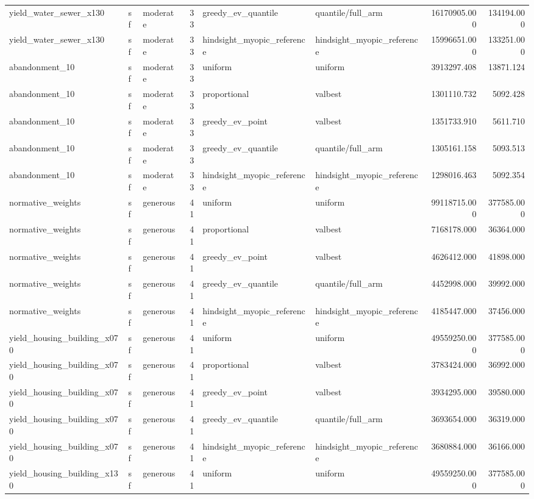 \begin{tabular}{lllrllrr}
yield\_water\_sewer\_x130 & sf & moderate & 33 & greedy\_ev\_quantile & quantile/full\_arm & 16170905.000 & 134194.000 \\
yield\_water\_sewer\_x130 & sf & moderate & 33 & hindsight\_myopic\_reference & hindsight\_myopic\_reference & 15996651.000 & 133251.000 \\
abandonment\_10 & sf & moderate & 33 & uniform & uniform & 3913297.408 & 13871.124 \\
abandonment\_10 & sf & moderate & 33 & proportional & valbest & 1301110.732 & 5092.428 \\
abandonment\_10 & sf & moderate & 33 & greedy\_ev\_point & valbest & 1351733.910 & 5611.710 \\
abandonment\_10 & sf & moderate & 33 & greedy\_ev\_quantile & quantile/full\_arm & 1305161.158 & 5093.513 \\
abandonment\_10 & sf & moderate & 33 & hindsight\_myopic\_reference & hindsight\_myopic\_reference & 1298016.463 & 5092.354 \\
normative\_weights & sf & generous & 41 & uniform & uniform & 99118715.000 & 377585.000 \\
normative\_weights & sf & generous & 41 & proportional & valbest & 7168178.000 & 36364.000 \\
normative\_weights & sf & generous & 41 & greedy\_ev\_point & valbest & 4626412.000 & 41898.000 \\
normative\_weights & sf & generous & 41 & greedy\_ev\_quantile & quantile/full\_arm & 4452998.000 & 39992.000 \\
normative\_weights & sf & generous & 41 & hindsight\_myopic\_reference & hindsight\_myopic\_reference & 4185447.000 & 37456.000 \\
yield\_housing\_building\_x070 & sf & generous & 41 & uniform & uniform & 49559250.000 & 377585.000 \\
yield\_housing\_building\_x070 & sf & generous & 41 & proportional & valbest & 3783424.000 & 36992.000 \\
yield\_housing\_building\_x070 & sf & generous & 41 & greedy\_ev\_point & valbest & 3934295.000 & 39580.000 \\
yield\_housing\_building\_x070 & sf & generous & 41 & greedy\_ev\_quantile & quantile/full\_arm & 3693654.000 & 36319.000 \\
yield\_housing\_building\_x070 & sf & generous & 41 & hindsight\_myopic\_reference & hindsight\_myopic\_reference & 3680884.000 & 36166.000 \\
yield\_housing\_building\_x130 & sf & generous & 41 & uniform & uniform & 49559250.000 & 377585.000 \\

\end{tabular}
